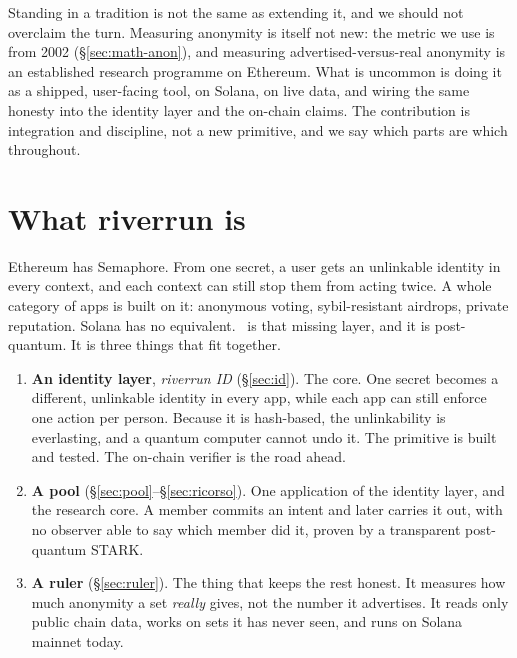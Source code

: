 \documentclass[11pt]{article}
\begin{document}
\begin{honest}
Standing in a tradition is not the same as extending it, and we should not overclaim the
turn. Measuring anonymity is itself not new: the metric we use is from 2002
(\S\ref{sec:math-anon}), and measuring advertised-versus-real anonymity is an established
research programme on Ethereum. What is uncommon is doing it as a shipped, user-facing
tool, on Solana, on live data, and wiring the same honesty into the identity layer and
the on-chain claims. The contribution is integration and discipline, not a new
primitive, and we say which parts are which throughout.
\end{honest}

\section{What riverrun is}
\label{sec:what}

Ethereum has Semaphore. From one secret, a user gets an unlinkable identity in every
context, and each context can still stop them from acting twice. A whole category of
apps is built on it: anonymous voting, sybil-resistant airdrops, private reputation.
Solana has no equivalent. \river\ is that missing layer, and it is post-quantum. It is
three things that fit together.

\begin{enumerate}[leftmargin=1.5em,itemsep=0.3em]
\item \textbf{An identity layer}, \emph{riverrun ID} (\S\ref{sec:id}). The core. One
      secret becomes a different, unlinkable identity in every app, while each app can
      still enforce one action per person. Because it is hash-based, the unlinkability
      is everlasting, and a quantum computer cannot undo it. The primitive is built and
      tested. The on-chain verifier is the road ahead.
\item \textbf{A pool} (\S\ref{sec:pool}--\S\ref{sec:ricorso}). One application of the
      identity layer, and the research core. A member commits an intent and later
      carries it out, with no observer able to say which member did it, proven by a
      transparent post-quantum STARK.
\item \textbf{A ruler} (\S\ref{sec:ruler}). The thing that keeps the rest honest. It
      measures how much anonymity a set \emph{really} gives, not the number it
      advertises. It reads only public chain data, works on sets it has never seen, and
      runs on Solana mainnet today.
\end{enumerate}
\end{document}
